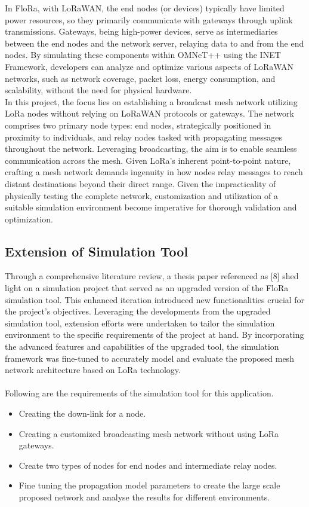 In FloRa, with LoRaWAN, the end nodes (or devices) typically have limited power resources, so they primarily communicate with gateways through uplink transmissions. Gateways, being high-power devices, serve as intermediaries between the end nodes and the network server, relaying data to and from the end nodes. By simulating these components within OMNeT++ using the INET Framework, developers can analyze and optimize various aspects of LoRaWAN networks, such as network coverage, packet loss, energy consumption, and scalability, without the need for physical hardware. \\

In this project, the focus lies on establishing a broadcast mesh network utilizing LoRa nodes without relying on LoRaWAN protocols or gateways. The network comprises two primary node types: end nodes, strategically positioned in proximity to individuals, and relay nodes tasked with propagating messages throughout the network. Leveraging broadcasting, the aim is to enable seamless communication across the mesh. Given LoRa's inherent point-to-point nature, crafting a mesh network demands ingenuity in how nodes relay messages to reach distant destinations beyond their direct range. Given the impracticality of physically testing the complete network, customization and utilization of a suitable simulation environment become imperative for thorough validation and optimization.

\subsection{Extension of Simulation Tool}
\label{sec:Extension of the Simulation Tool}

\hspace{12pt} Through a comprehensive literature review, a thesis paper referenced as [8] shed light on a simulation project that served as an upgraded version of the FloRa simulation tool. This enhanced iteration introduced new functionalities crucial for the project's objectives. Leveraging the developments from the upgraded simulation tool, extension efforts were undertaken to tailor the simulation environment to the specific requirements of the project at hand. By incorporating the advanced features and capabilities of the upgraded tool, the simulation framework was fine-tuned to accurately model and evaluate the proposed mesh network architecture based on LoRa technology.\\
\\
Following are the requirements of the simulation tool for this application.
\begin{itemize}
    \item Creating the down-link for a node.
    \item Creating a customized broadcasting mesh network without using LoRa gateways.
    \item Create two types of nodes for end nodes and intermediate relay nodes.
    \item Fine tuning the propagation model parameters to create the large scale proposed network and analyse the results for different environments.

\end{itemize}


